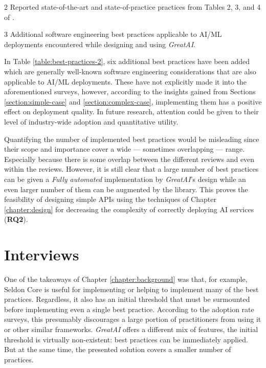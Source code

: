 \begin{table}
\begin{threeparttable}
{\begin{tabular}{p{7cm}@{\hskip 0.5cm}l@{\hskip 0cm}c}
\end{tabular}}
\begin{tablenotes}
    \item[2] Reported state-of-the-art and state-of-practice practices from Tables 2, 3, and 4 of \cite{john2020architecting}.
    \item[3] Additional software engineering best practices applicable to AI/ML deployments encountered while designing and using \textit{GreatAI}.
\end{tablenotes}
\end{threeparttable}
\end{table}

\FloatBarrier

In Table \ref{table:best-practices-2}, six additional best practices have been added which are generally well-known software engineering considerations that are also applicable to AI/ML deployments. These have not explicitly made it into the aforementioned surveys, however, according to the insights gained from Sections \ref{section:simple-case} and \ref{section:complex-case}, implementing them has a positive effect on deployment quality. In future research, attention could be given to their level of industry-wide adoption and quantitative utility.

Quantifying the number of implemented best practices would be misleading since their scope and importance cover a wide --- sometimes overlapping --- range. Especially because there is some overlap between the different reviews and even within the reviews. However, it is still clear that a large number of best practices can be given a \textit{Fully automated} implementation by \textit{GreatAI}'s design while an even larger number of them can be augmented by the library. This proves the feasibility of designing simple APIs using the techniques of Chapter \ref{chapter:design} for decreasing the complexity of correctly deploying AI services (\textbf{RQ2}).

\section{Interviews} \label{section:interviews}

One of the takeaways of Chapter \ref{chapter:background} was that, for example, Seldon Core is useful for implementing or helping to implement many of the best practices. Regardless, it also has an initial threshold that must be surmounted before implementing even a single best practice. According to the adoption rate surveys, this presumably discourages a large portion of practitioners from using it or other similar frameworks. \textit{GreatAI} offers a different mix of features, the initial threshold is virtually non-existent: best practices can be immediately applied. But at the same time, the presented solution covers a smaller number of practices. 


